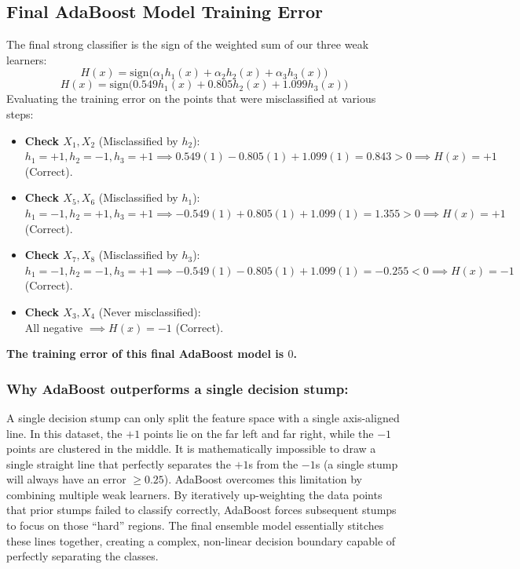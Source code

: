 \documentclass[twoside, 10pt]{article}
\begin{document}
\subsection{Final AdaBoost Model Training Error}
The final strong classifier is the sign of the weighted sum of our three weak learners:
\[
H(x) = \text{sign}\Big(\alpha_1 h_1(x) + \alpha_2 h_2(x) + \alpha_3 h_3(x)\Big)
\]
\[
H(x) = \text{sign}\Big(0.549 h_1(x) + 0.805 h_2(x) + 1.099 h_3(x)\Big)
\]
Evaluating the training error on the points that were misclassified at various steps:
\begin{itemize}
    \item \textbf{Check $X_1, X_2$} (Misclassified by $h_2$):\\
    $h_1 = +1, h_2 = -1, h_3 = +1 \implies 0.549(1) - 0.805(1) + 1.099(1) = 0.843 > 0 \implies H(x) = +1$ (Correct).
    \item \textbf{Check $X_5, X_6$} (Misclassified by $h_1$):\\
    $h_1 = -1, h_2 = +1, h_3 = +1 \implies -0.549(1) + 0.805(1) + 1.099(1) = 1.355 > 0 \implies H(x) = +1$ (Correct).
    \item \textbf{Check $X_7, X_8$} (Misclassified by $h_3$):\\
    $h_1 = -1, h_2 = -1, h_3 = +1 \implies -0.549(1) - 0.805(1) + 1.099(1) = -0.255 < 0 \implies H(x) = -1$ (Correct).
    \item \textbf{Check $X_3, X_4$} (Never misclassified): \\
    All negative $\implies H(x) = -1$ (Correct).
\end{itemize}
\textbf{The training error of this final AdaBoost model is $0$.}
\subsubsection{Why AdaBoost outperforms a single decision stump:}
A single decision stump can only split the feature space with a single axis-aligned line. In this dataset, the $+1$ points lie on the far left and far right, while the $-1$ points are clustered in the middle. It is mathematically impossible to draw a single straight line that perfectly separates the $+1$s from the $-1$s (a single stump will always have an error $\ge 0.25$).
AdaBoost overcomes this limitation by combining multiple weak learners. By iteratively up-weighting the data points that prior stumps failed to classify correctly, AdaBoost forces subsequent stumps to focus on those ``hard'' regions. The final ensemble model essentially stitches these lines together, creating a complex, non-linear decision boundary capable of perfectly separating the classes.
\end{document}

